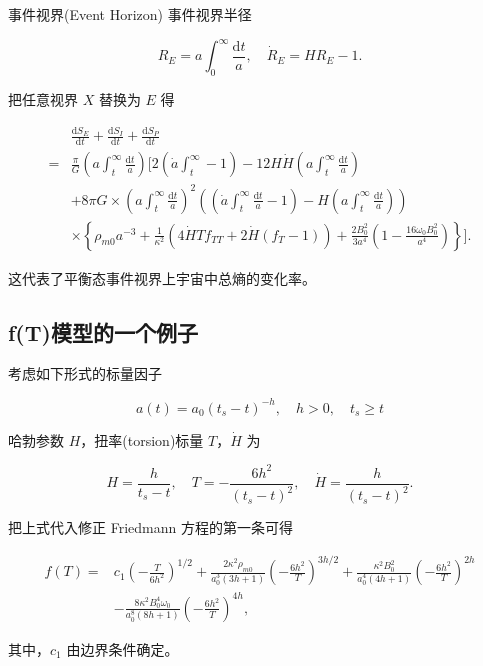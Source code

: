 \documentclass[9pt, dvipsnames]{beamer} %
\begin{document}
\begin{frame}{事件视界(Event Horizon)}
    事件视界半径

    $$
    R_E = a\int_0^{\infty} \frac{\mathrm{d}t }{a } ,\quad
    \dot{R}_E = H R_E - 1.
    $$

    把任意视界 $X$ 替换为 $E$ 得

    $$
    \begin{aligned}
        &\frac{\mathrm{d}S_E}{\mathrm{d}t} + \frac{\mathrm{d}S_I}{\mathrm{d}t} + \frac{\mathrm{d}S_P}{\mathrm{d}t} \\
        =&\frac{\pi}{G} \left(a\int_t^\infty \frac{\mathrm{d}t}{a}\right)\bigg[2\left(\dot{a}\int_t^\infty -1 \right) - 12H\dot{H} \left(a\int_t^\infty \frac{\mathrm{d}t}{a}\right) \\
        &+8\pi G\times \left(a\int_t^\infty\frac{\mathrm{d}t}{a}\right)^2\left(\left(\dot{a}\int_t^\infty\frac{\mathrm{d}t}{a}-1\right)-H\left(a\int_t^\infty\frac{\mathrm{d}t}{a}\right)\right) \\
        &\times \left\{\rho_{m0}a^{-3} + \frac{1}{\kappa^2} \left(4\dot{H}T f_{TT} + 2\dot{H}(f_T-1)\right) + \frac{2B_0^2}{3a^4}\left(1-\frac{16\omega_0B_0^2}{a^4}\right) \right\} \bigg]. 
    \end{aligned}
    $$

    这代表了平衡态事件视界上宇宙中总熵的变化率。

\end{frame}

\subsection{f(T)模型的一个例子}

\begin{frame}
    考虑如下形式的标量因子

    $$
    a(t)
    =a_0\left(t_s-t \right)^{-h},\quad
    h>0,\quad t_s\geqslant t
    $$

    哈勃参数 $H$，扭率(torsion)标量 $T$，$\dot{{H}}$ 为

    $$
    H = \frac{h }{t_s - t } ,\quad
    T = -\frac{6h^2 }{\left(t_s-t \right)^2 } ,\quad
    \dot{H} = \frac{h }{\left(t_s - t \right)^2 }.
    $$

    把上式代入修正 Friedmann 方程的第一条可得

    $$
    \begin{aligned}
        f(T)
        =&c_1\left(-\frac{T }{6h^2 }  \right)^{1/2} + \frac{2\kappa^2 \rho_{m0} }{a_0^3\left(3h+1 \right) } \left(-\frac{6h^2 }{T }  \right)^{3h/2} + \frac{\kappa^2 B_0^2 }{a_0^4\left(4h+1 \right) } \left(-\frac{6h^2 }{T }  \right)^{2h} \\
        &- \frac{8\kappa^2 B_0^4 \omega_0 }{a_0^8 \left(8h+1 \right) } \left(-\frac{6h^2 }{T }  \right)^{4h},
    \end{aligned}
    $$

    其中，$c_1$ 由边界条件确定。

\end{frame}
\end{document}
